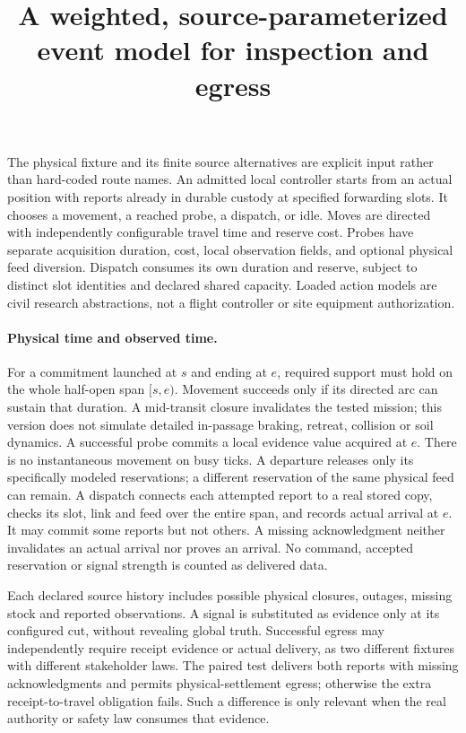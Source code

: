 \documentclass[11pt]{article}
\title{A weighted, source-parameterized event model for inspection and egress}
\author{}\date{}
\begin{document}
\maketitle
The physical fixture and its finite source alternatives are explicit
input rather than hard-coded route names. An admitted local controller
starts from an actual position with reports already in durable custody
at specified forwarding slots. It chooses a movement, a reached probe,
a dispatch, or idle. Moves are directed with independently configurable
travel time and reserve cost. Probes have separate acquisition duration,
cost, local observation fields, and optional physical feed diversion.
Dispatch consumes its own duration and reserve, subject to distinct
slot identities and declared shared capacity. Loaded action models are
civil research abstractions, not a flight controller or site equipment
authorization.

\paragraph{Physical time and observed time.}
For a commitment launched at $s$ and ending at $e$, required support
must hold on the whole half-open span $[s,e)$. Movement succeeds only
if its directed arc can sustain that duration. A mid-transit closure
invalidates the tested mission; this version does not simulate detailed
in-passage braking, retreat, collision or soil dynamics. A successful
probe commits a local evidence value acquired at $e$. There is no
instantaneous movement on busy ticks. A departure releases only its
specifically modeled reservations; a different reservation of the same
physical feed can remain. A dispatch connects each attempted report
to a real stored copy, checks its slot, link and feed over the entire
span, and records actual arrival at $e$. It may commit some reports
but not others. A missing acknowledgment neither invalidates an actual
arrival nor proves an arrival. No command, accepted reservation or
signal strength is counted as delivered data.

Each declared source history includes possible physical closures, outages,
missing stock and reported observations. A signal is substituted as
evidence only at its configured cut, without revealing global truth.
Successful egress may independently require receipt evidence or actual
delivery, as two different fixtures with different stakeholder laws.
The paired test delivers both reports with missing acknowledgments and
permits physical-settlement egress; otherwise the extra
receipt-to-travel obligation fails. Such a difference is only relevant
when the real authority or safety law consumes that evidence.
\end{document}
